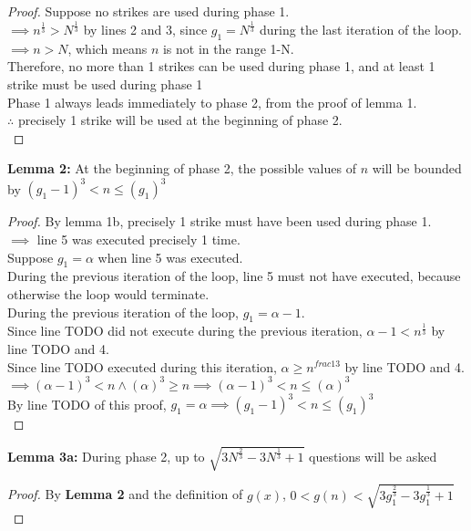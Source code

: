 \begin{problem}
\begin{proof}
    Suppose no strikes are used during phase 1. \\
    $\implies n^{\frac{1}{3}} > N^{\frac{1}{3}}$ by lines 2 and 3, since $g_1 = N^{\frac{1}{3}}$ during the last iteration of the loop. \\
    $\implies n > N$, which means $n$ is not in the range 1-N. \\
    Therefore, no more than 1 strikes can be used during phase 1, and at least 1 strike must be used during phase 1 \\
    Phase 1 always leads immediately to phase 2, from the proof of lemma 1. \\
    $\therefore $ precisely 1 strike will be used at the beginning of phase 2. \\
  \end{proof}
  \textbf{Lemma 2:} At the beginning of phase 2, the possible values of $n$ will be bounded by $(g_1 - 1)^3 < n \leq (g_1)^3$ \\
  \begin{proof}
    By lemma 1b, precisely 1 strike must have been used during phase 1. \\
    $\implies $ line 5 was executed precisely 1 time. \\
    Suppose $g_1 = \alpha$ when line 5 was executed. \\
    During the previous iteration of the loop, line 5 must not have executed, because otherwise the loop would terminate. \\
    During the previous iteration of the loop, $g_1 = \alpha - 1$. \\
    Since line TODO did not execute during the previous iteration, $\alpha - 1 < n^{\frac{1}{3}}$ by line TODO and 4. \\
    Since line TODO executed during this iteration, $\alpha \geq n^{frac{1}{3}}$ by line TODO and 4. \\
    $\implies (\alpha - 1)^3 < n \land (\alpha)^3 \geq n \implies (\alpha - 1)^3 < n \leq (\alpha)^3$ \\
    By line TODO of this proof, $g_1 = \alpha \implies (g_1 - 1)^3 < n \leq (g_1)^3$ \\
  \end{proof}
  \textbf{Lemma 3a:} During phase 2, up to $\sqrt{3N^{\frac{2}{3}} - 3N^{\frac{1}{3}} + 1}$ questions will be asked
  \begin{proof}
    By \textbf{Lemma 2} and the definition of $g(x)$, $ 0 < g(n) < \sqrt{3g_1^{\frac{2}{3}} - 3g_1^{\frac{1}{3}} + 1}$ \\

\end{proof}
\end{problem}
